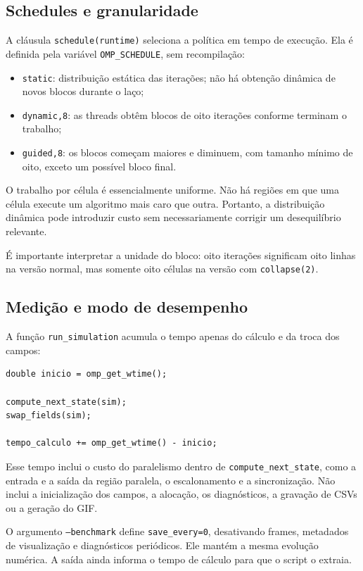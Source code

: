 \documentclass[12pt,a4paper]{article}
\begin{document}
\subsection{Schedules e granularidade}
A cláusula \texttt{schedule(runtime)} seleciona a política em tempo de execução. Ela é definida pela variável \texttt{OMP\_SCHEDULE}, sem recompilação:
\begin{itemize}
    \item \texttt{static}: distribuição estática das iterações; não há obtenção dinâmica de novos blocos durante o laço;
    \item \texttt{dynamic,8}: as threads obtêm blocos de oito iterações conforme terminam o trabalho;
    \item \texttt{guided,8}: os blocos começam maiores e diminuem, com tamanho mínimo de oito, exceto um possível bloco final.
\end{itemize}
O trabalho por célula é essencialmente uniforme. Não há regiões em que uma célula execute um algoritmo mais caro que outra. Portanto, a distribuição dinâmica pode introduzir custo sem necessariamente corrigir um desequilíbrio relevante.

É importante interpretar a unidade do bloco: oito iterações significam oito linhas na versão normal, mas somente oito células na versão com \texttt{collapse(2)}.



\subsection{Medição e modo de desempenho}
A função \texttt{run\_simulation} acumula o tempo apenas do cálculo e da troca dos campos:
\begin{lstlisting}[style=CStyle,caption={Trecho que delimita a medição em cada passo.}]
double inicio = omp_get_wtime();

compute_next_state(sim);
swap_fields(sim);

tempo_calculo += omp_get_wtime() - inicio;
\end{lstlisting}
Esse tempo inclui o custo do paralelismo dentro de \texttt{compute\_next\_state}, como a entrada e a saída da região paralela, o escalonamento e a sincronização. Não inclui a inicialização dos campos, a alocação, os diagnósticos, a gravação de CSVs ou a geração do GIF.

O argumento \texttt{--benchmark} define \texttt{save\_every=0}, desativando frames, metadados de visualização e diagnósticos periódicos. Ele mantém a mesma evolução numérica. A saída ainda informa o tempo de cálculo para que o script o extraia.
\end{document}
